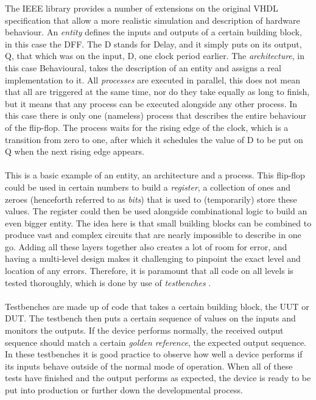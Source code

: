\documentclass[11pt,british]{article}
\begin{document}
The \gls{IEEE} library provides a number of extensions on the original \gls{VHDL} specification that allow a more realistic simulation and description of hardware behaviour. An \emph{entity} defines the inputs and outputs of a certain building block, in this case the \gls{DFF}. The D stands for Delay, and it simply puts on its output, Q, that which was on the input, D, one clock period earlier. The \emph{architecture}, in this case Behavioural, takes the description of an entity and assigns a real implementation to it. All \emph{processes} are executed in parallel, this does not mean that all are triggered at the same time, nor do they take equally as long to finish, but it means that any process can be executed alongside any other process. In this case there is only one (nameless) process that describes the entire behaviour of the flip-flop. The process waits for the rising edge of the clock, which is a transition from zero to one, after which it schedules the value of D to be put on Q when the next rising edge appears.
\\
\\
This is a basic example of an entity, an architecture and a process. This flip-flop could be used in certain numbers to build a \emph{register}, a collection of ones and zeroes (henceforth referred to as \emph{bits}) that is used to (temporarily) store these values. The register could then be used alongside combinational logic to build an even bigger entity. The idea here is that small building blocks can be combined to produce vast and complex circuits that are nearly impossible to describe in one go. Adding all these layers together also creates a lot of room for error, and having a multi-level design makes it challenging to pinpoint the exact level and location of any errors. Therefore, it is paramount that all code on all levels is tested thoroughly, which is done by use of \emph{testbenches} \cite{bergeron00}.
\\
\\
Testbenches are made up of code that takes a certain building block, the \gls{UUT} or \gls{DUT}. The testbench then puts a certain sequence of values on the inputs and monitors the outputs. If the device performs normally, the received output sequence should match a certain \emph{golden reference}, the expected output sequence. In these testbenches it is good practice to observe how well a device performs if its inputs behave outside of the normal mode of operation. When all of these tests have finished and the output performs as expected, the device is ready to be put into production or further down the developmental process.
\end{document}

